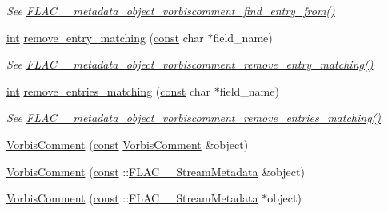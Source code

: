 \begin{DoxyCompactItemize}
\begin{DoxyCompactList}\small\item\em See \hyperlink{group__flac__metadata__object_gae094c1ce4f248d49e8c099661bd5288e}{F\+L\+A\+C\+\_\+\+\_\+metadata\+\_\+object\+\_\+vorbiscomment\+\_\+find\+\_\+entry\+\_\+from()} \end{DoxyCompactList}\item 
\hyperlink{xmltok_8h_a5a0d4a5641ce434f1d23533f2b2e6653}{int} \hyperlink{class_f_l_a_c_1_1_metadata_1_1_vorbis_comment_af0770518f35fe18fb9a0cc5c0542c4b7}{remove\+\_\+entry\+\_\+matching} (\hyperlink{getopt1_8c_a2c212835823e3c54a8ab6d95c652660e}{const} char $\ast$field\+\_\+name)
\begin{DoxyCompactList}\small\item\em See \hyperlink{group__flac__metadata__object_ga6812052a110800bef2f4139017501507}{F\+L\+A\+C\+\_\+\+\_\+metadata\+\_\+object\+\_\+vorbiscomment\+\_\+remove\+\_\+entry\+\_\+matching()} \end{DoxyCompactList}\item 
\hyperlink{xmltok_8h_a5a0d4a5641ce434f1d23533f2b2e6653}{int} \hyperlink{class_f_l_a_c_1_1_metadata_1_1_vorbis_comment_adde2dc584e31f29d67fcc6d15d2d1034}{remove\+\_\+entries\+\_\+matching} (\hyperlink{getopt1_8c_a2c212835823e3c54a8ab6d95c652660e}{const} char $\ast$field\+\_\+name)
\begin{DoxyCompactList}\small\item\em See \hyperlink{group__flac__metadata__object_ga525525f5f21b1caee776cba3cfb6d72f}{F\+L\+A\+C\+\_\+\+\_\+metadata\+\_\+object\+\_\+vorbiscomment\+\_\+remove\+\_\+entries\+\_\+matching()} \end{DoxyCompactList}\end{DoxyCompactItemize}
{\bf }\par
\begin{DoxyCompactItemize}
\item 
\hyperlink{class_f_l_a_c_1_1_metadata_1_1_vorbis_comment_a436a5c6a42a83a88206376805743fe3b}{Vorbis\+Comment} (\hyperlink{getopt1_8c_a2c212835823e3c54a8ab6d95c652660e}{const} \hyperlink{class_f_l_a_c_1_1_metadata_1_1_vorbis_comment}{Vorbis\+Comment} \&object)
\item 
\hyperlink{class_f_l_a_c_1_1_metadata_1_1_vorbis_comment_a2a788c0d96b5b8b22d089663b5e53b72}{Vorbis\+Comment} (\hyperlink{getopt1_8c_a2c212835823e3c54a8ab6d95c652660e}{const} \+::\hyperlink{struct_f_l_a_c_____stream_metadata}{F\+L\+A\+C\+\_\+\+\_\+\+Stream\+Metadata} \&object)
\item 
\hyperlink{class_f_l_a_c_1_1_metadata_1_1_vorbis_comment_a9ca0e61561f14b1fff423b3334e14a62}{Vorbis\+Comment} (\hyperlink{getopt1_8c_a2c212835823e3c54a8ab6d95c652660e}{const} \+::\hyperlink{struct_f_l_a_c_____stream_metadata}{F\+L\+A\+C\+\_\+\+\_\+\+Stream\+Metadata} $\ast$object)
\end{DoxyCompactItemize}

